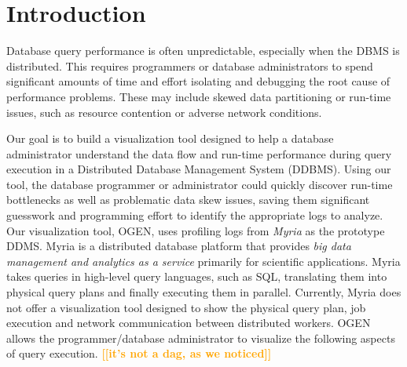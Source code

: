 \documentclass{chi2009}
\newcommand*{\system}{OGEN\xspace}
\newcommand{\todo}[1]{\textsf{\textbf{\textcolor{Orange}{[[#1]]}}}}
\begin{document}
\section{Introduction}

Database query performance is often unpredictable, especially when the DBMS is
distributed. This requires programmers or database administrators to spend
significant amounts of time and effort isolating and debugging the root cause
of performance problems. These may include skewed data partitioning or run-time
issues, such as resource contention or adverse network conditions.

Our goal is to build a visualization tool designed to help a database administrator understand the data flow and run-time
performance during query execution in a Distributed Database Management System (DDBMS). Using our tool, the
database programmer or administrator could quickly discover run-time bottlenecks as well as problematic data skew issues,
saving them significant guesswork and programming effort to identify the appropriate logs to analyze. Our visualization tool,
\system, uses profiling logs from \emph{Myria} \cite{myria} as the prototype DDMS. Myria is a distributed
database platform that provides \emph{big data management and analytics as a service} primarily for scientific applications.
Myria takes queries in high-level query languages, such as SQL, translating them into physical query plans and finally executing
them in parallel. Currently, Myria does not offer a visualization tool designed to show the physical query plan, job execution and network
communication between distributed workers. \system allows the programmer/database administrator to visualize the following aspects
of query execution.
\todo{it's not a dag, as we noticed}
\end{document}
